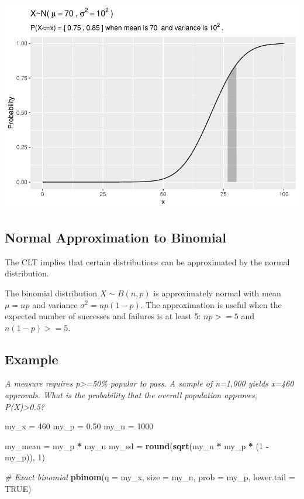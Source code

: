 \documentclass[
]{book}
\newenvironment{Shaded}{\begin{snugshade}}{\end{snugshade}}
\newcommand{\CommentTok}[1]{\textcolor[rgb]{0.56,0.35,0.01}{\textit{#1}}}
\newcommand{\DataTypeTok}[1]{\textcolor[rgb]{0.13,0.29,0.53}{#1}}
\newcommand{\DecValTok}[1]{\textcolor[rgb]{0.00,0.00,0.81}{#1}}
\newcommand{\FloatTok}[1]{\textcolor[rgb]{0.00,0.00,0.81}{#1}}
\newcommand{\KeywordTok}[1]{\textcolor[rgb]{0.13,0.29,0.53}{\textbf{#1}}}
\newcommand{\NormalTok}[1]{#1}
\newcommand{\OperatorTok}[1]{\textcolor[rgb]{0.81,0.36,0.00}{\textbf{#1}}}
\newcommand{\OtherTok}[1]{\textcolor[rgb]{0.56,0.35,0.01}{#1}}
\newcommand{\StringTok}[1]{\textcolor[rgb]{0.31,0.60,0.02}{#1}}
\begin{document}
\includegraphics{data-sci_files/figure-latex/unnamed-chunk-24-1.pdf}

\hypertarget{normal-approximation-to-binomial}{%
\subsection{Normal Approximation to Binomial}\label{normal-approximation-to-binomial}}

The CLT implies that certain distributions can be approximated by the normal distribution.

The binomial distribution \(X \sim B(n,p)\) is approximately normal with mean \(\mu = n p\) and variance \(\sigma^2=np(1-p)\). The approximation is useful when the expected number of successes and failures is at least 5: \(np>=5\) and \(n(1-p)>=5\).

\hypertarget{example-14}{%
\subsection{Example}\label{example-14}}

\emph{A measure requires p\textgreater=50\% popular to pass. A sample of n=1,000 yields x=460 approvals. What is the probability that the overall population approves, P(X)\textgreater0.5?}

\begin{Shaded}
\begin{Highlighting}[]
\NormalTok{my_x =}\StringTok{ }\DecValTok{460}
\NormalTok{my_p =}\StringTok{ }\FloatTok{0.50}
\NormalTok{my_n =}\StringTok{ }\DecValTok{1000}

\NormalTok{my_mean =}\StringTok{ }\NormalTok{my_p }\OperatorTok{*}\StringTok{ }\NormalTok{my_n}
\NormalTok{my_sd =}\StringTok{ }\KeywordTok{round}\NormalTok{(}\KeywordTok{sqrt}\NormalTok{(my_n }\OperatorTok{*}\StringTok{ }\NormalTok{my_p }\OperatorTok{*}\StringTok{ }\NormalTok{(}\DecValTok{1} \OperatorTok{-}\StringTok{ }\NormalTok{my_p)), }\DecValTok{1}\NormalTok{)}

\CommentTok{# Exact binomial}
\KeywordTok{pbinom}\NormalTok{(}\DataTypeTok{q =}\NormalTok{ my_x, }\DataTypeTok{size =}\NormalTok{ my_n, }\DataTypeTok{prob =}\NormalTok{ my_p, }\DataTypeTok{lower.tail =} \OtherTok{TRUE}\NormalTok{)}
\end{Highlighting}
\end{Shaded}
\end{document}
